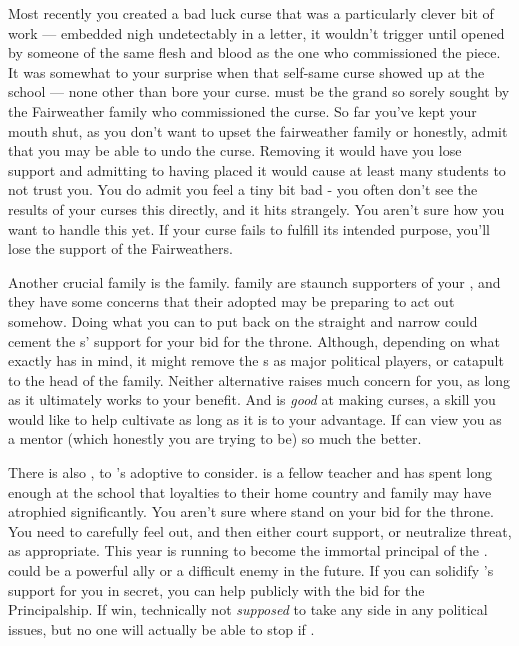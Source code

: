 \documentclass[char]{GL2020}
\begin{document}
Most recently you created a bad luck curse that was a particularly clever bit of work — embedded nigh undetectably in a letter, it wouldn't trigger until opened by someone of the same flesh and blood as the one who commissioned the piece. It was somewhat to your surprise when that self-same curse showed up at the school — none other than \cInitiate{\intro} bore your curse. \cInitiate{\They} must be the grand\cInitiate{\offspring} so sorely sought by the Fairweather family who commissioned the curse. So far you've kept your mouth shut, as you don't want to upset the fairweather family or honestly, admit that you may be able to undo the curse. Removing it would have you lose support and admitting to having placed it would cause at least many students to not trust you.  You do admit you feel a tiny bit bad - you often don't see the results of your curses this directly, and it hits strangely. You aren’t sure how you want to handle this yet. If your curse fails to fulfill its intended purpose, you'll lose the support of the Fairweathers.

Another crucial family is the \cAdopted{\formal} family. \cAdopted{\intros} family are staunch supporters of your \cQueen{\parent}, and they have some concerns that their adopted \cAdopted{\offspring} may be preparing to act out somehow. Doing what you can to put \cAdopted{\them} back on the straight and narrow could cement the \cAdopted{\formal}s' support for your bid for the throne. Although, depending on what exactly \cAdopted{} has in mind, it might remove the \cAdopted{\formal}s as major political players, or catapult \cAdopted{} to the head of the family. Neither alternative raises much concern for you, as long as it ultimately works to your benefit. And \cAdopted{} is \emph{good} at making curses, a skill you would like to help \cAdopted{\them} cultivate as long as it is to your advantage. If \cAdopted{} can view you as a mentor (which honestly you are trying to be) so much the better.

There is also \cMusic{\intro}, \cMusic{\auncle} to \cAdopted{}'s adoptive \cAdoptedParentOne{\parent} to consider. \cMusic{} is a fellow teacher and has spent long enough at the school that \cMusic{\their} loyalties to their home country and family may have atrophied significantly. You aren't sure where \cMusic{\they} stand on your bid for the throne. You need to carefully feel \cMusic{\them} out, and then either court \cMusic{\their} support, or neutralize \cMusic{\their} threat, as appropriate.  This year \cMusic{} is running to become the immortal principal of the \pSc{}. \cMusic{\They} could be a powerful ally or a difficult enemy in the future. If you can solidify \cMusic{}’s support for you in secret, you can help \cMusic{\them} publicly with the bid for the Principalship. If  \cMusic{\they} win\cMusic{\verbs}, technically \cMusic{\theyare} not \emph{supposed} to take any side in any political issues, but no one will actually be able to stop \cMusic{\them} if \cMusic{\theydo}.
\end{document}
